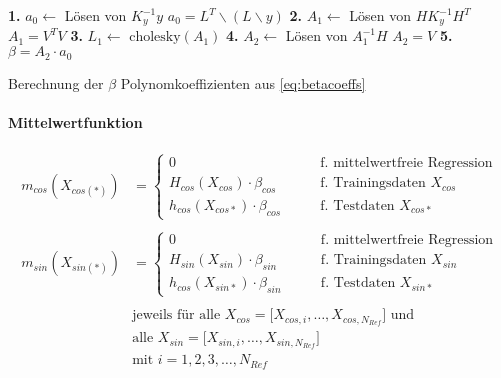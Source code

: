 \begin{algorithm}
	\SetAlgoLined
	\textbf{1.} $a_0 \leftarrow$ Lösen von $K_y^{-1} y$\;
	\Indp 
		$a_0 = L^T \backslash (L \backslash y)$\;
	\Indm
	\textbf{2.} $A_1 \leftarrow$ Lösen von $H K_y^{-1} H^T$\;
	\Indp
		$A_1 = V^T V$\;
	\Indm
	\textbf{3.} $L_1 \leftarrow$ $\text{cholesky}(A_1)$\;
	\textbf{4.} $A_2 \leftarrow$ Lösen von $A_1^{-1} H$\;
	\Indp
		$A_2 = V$\;
	\Indm
	\textbf{5.} $\beta = A_2 \cdot a_0$
	\caption{Berechnung der $\beta$ Polynomkoeffizienten aus \autoref{eq:betacoeffs}}
	\label{alg:beta-koeffs}
\end{algorithm}


\paragraph*{Mittelwertfunktion}


\begin{align}\label{eq:gprmean}
	m_{cos}(X_{cos(*)}) &=
		\begin{cases}
			0                                    &\qquad \text{f. mittelwertfreie Regression} \\
			H_{cos}(X_{cos}) \cdot \beta_{cos} 	 &\qquad \text{f. Trainingsdaten } X_{cos} \\
			h_{cos}(X_{cos*}) \cdot \beta_{cos} &\qquad \text{f. Testdaten } X_{cos*}
		\end{cases} \nonumber \\
	\\
	m_{sin}(X_{sin(*)}) &=
		\begin{cases}
			0                                    &\qquad \text{f. mittelwertfreie Regression} \\
			H_{sin}(X_{sin}) \cdot \beta_{sin} 	 &\qquad \text{f. Trainingsdaten } X_{sin} \\
			h_{cos}(X_{sin*}) \cdot \beta_{sin} &\qquad \text{f. Testdaten } X_{sin*}
		\end{cases} \nonumber \\
	\nonumber \\
& \text{jeweils für alle } X_{cos} = \big[ X_{cos,i},\dots, X_{cos,N_{Ref}} \big] \text{ und } \nonumber \\
& \text{alle } X_{sin} = \big[ X_{sin,i},\dots, X_{sin,N_{Ref}} \big] \nonumber \\
& \text{mit } i = 1,2,3,\ldots,N_{Ref} \nonumber
\end{align}


